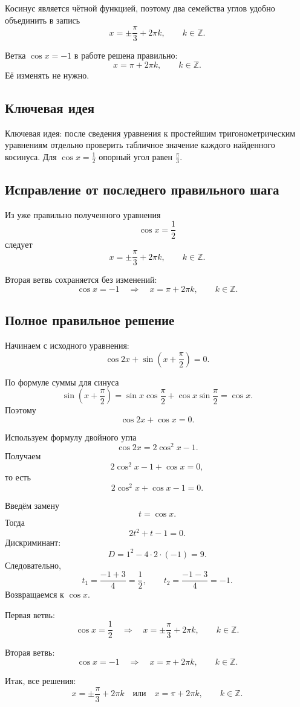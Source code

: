 \documentclass[12pt,a4paper]{article}
\newcommand{\keyidea}[1]{\textcolor{blue!60!black}{Ключевая идея:} #1}
\begin{document}
Косинус является чётной функцией, поэтому два семейства углов удобно объединить в запись
\[
x=\pm\frac{\pi}{3}+2\pi k,
\qquad k\in\mathbb Z.
\]

Ветка $\cos x=-1$ в работе решена правильно:
\[
x=\pi+2\pi k,
\qquad k\in\mathbb Z.
\]
Её изменять не нужно.

\subsection*{Ключевая идея}
\keyidea{после сведения уравнения к простейшим тригонометрическим уравнениям отдельно проверить табличное значение каждого найденного косинуса. Для $\cos x=\frac12$ опорный угол равен $\frac{\pi}{3}$.}

\subsection*{Исправление от последнего правильного шага}
Из уже правильно полученного уравнения
\[
\cos x=\frac12
\]
следует
\[
x=\pm\frac{\pi}{3}+2\pi k,
\qquad k\in\mathbb Z.
\]

Вторая ветвь сохраняется без изменений:
\[
\cos x=-1
\quad\Longrightarrow\quad
x=\pi+2\pi k,
\qquad k\in\mathbb Z.
\]

\subsection*{Полное правильное решение}
Начинаем с исходного уравнения:
\[
\cos 2x+\sin\left(x+\frac{\pi}{2}\right)=0.
\]

По формуле суммы для синуса
\[
\sin\left(x+\frac{\pi}{2}\right)
=\sin x\cos\frac{\pi}{2}+\cos x\sin\frac{\pi}{2}
=\cos x.
\]
Поэтому
\[
\cos 2x+\cos x=0.
\]

Используем формулу двойного угла
\[
\cos 2x=2\cos^2x-1.
\]
Получаем
\[
2\cos^2x-1+\cos x=0,
\]
то есть
\[
2\cos^2x+\cos x-1=0.
\]

Введём замену
\[
t=\cos x.
\]
Тогда
\[
2t^2+t-1=0.
\]
Дискриминант:
\[
D=1^2-4\cdot2\cdot(-1)=9.
\]
Следовательно,
\[
t_1=\frac{-1+3}{4}=\frac12,
\qquad
t_2=\frac{-1-3}{4}=-1.
\]
Возвращаемся к $\cos x$.

Первая ветвь:
\[
\cos x=\frac12
\quad\Longrightarrow\quad
x=\pm\frac{\pi}{3}+2\pi k,
\qquad k\in\mathbb Z.
\]

Вторая ветвь:
\[
\cos x=-1
\quad\Longrightarrow\quad
x=\pi+2\pi k,
\qquad k\in\mathbb Z.
\]

Итак, все решения:
\[
\boxed{x=\pm\frac{\pi}{3}+2\pi k
\quad\text{или}\quad
x=\pi+2\pi k,
\qquad k\in\mathbb Z.}
\]
\end{document}

